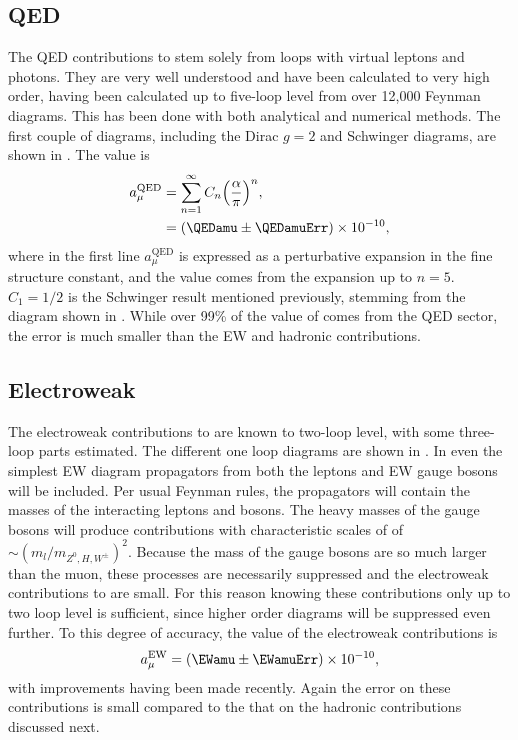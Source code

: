 \subsection{QED}
\label{subsec:QED}

The QED contributions to \amu stem solely from loops with virtual leptons and photons. They are very well understood and have been calculated to very high order, having been calculated up to five-loop level from over 12,000 Feynman diagrams. This has been done with both analytical and numerical methods. The first couple of diagrams, including the Dirac $g = 2$ and Schwinger diagrams, are shown in . The value is \cite{Kinoshita1,Kinoshita2}
		\begin{equation}
		\begin{aligned}
            a_{\mu}^{\text{QED}} &= \sum_{n=1}^{\infty} C_{n} \Big( \frac{\alpha}{\pi} \Big)^{n}, \\
            					 &= (\QEDamu \pm \QEDamuErr) \times 10^{-10},
		\end{aligned}
		\end{equation}
where in the first line $a_{\mu}^{\text{QED}}$ is expressed as a perturbative expansion in the fine structure constant, and the value comes from the expansion up to $n=5$. $C_{1} = 1/2$ is the Schwinger result mentioned previously, stemming from the diagram shown in . While over 99\% of the value of \amu comes from the QED sector, the error is much smaller than the EW and hadronic contributions.


\subsection{Electroweak}
\label{subsec:Electroweak}

The electroweak contributions to \amu are known to two-loop level, with some three-loop parts estimated. The different one loop diagrams are shown in . In even the simplest EW diagram propagators from both the leptons and EW gauge bosons will be included. Per usual Feynman rules, the propagators will contain the masses of the interacting leptons and bosons. The heavy masses of the gauge bosons will produce contributions with characteristic scales of of $\sim(m_{l}/m_{Z^{0},H,W^{\pm}})^{2}$. Because the mass of the gauge bosons are so much larger than the muon, these processes are necessarily suppressed and the electroweak contributions to \amu are small. For this reason knowing these contributions only up to two loop level is sufficient, since higher order diagrams will be suppressed even further. To this degree of accuracy, the value of the electroweak contributions is \cite{EW1,EW2}
		\begin{align}
            a_{\mu}^{\text{EW}} = (\EWamu \pm \EWamuErr) \times 10^{-10},
		\end{align}
with improvements having been made recently. Again the error on these contributions is small compared to the that on the hadronic contributions discussed next.


